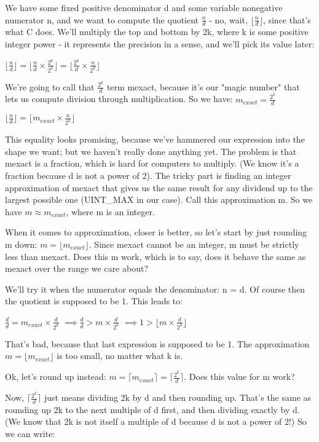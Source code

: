 We have some fixed positive denominator d and some variable nonegative numerator n, and we want to compute the quotient $\frac n d$ - no, wait, $\lfloor \frac n d \rfloor$, since that's what C does. We'll multiply the top and bottom by 2k, where k is some positive integer power - it represents the precision in a sense, and we'll pick its value later:

$\lfloor \frac n d \rfloor = \lfloor \frac n d \times \frac {2^k} {2^k} \rfloor = \lfloor \frac {2^k} d \times \frac n {2^k} \rfloor$

We're going to call that $\frac {2^k} d$ term mexact, because it's our "magic number" that lets us compute division through multiplication. So we have:
$m_{exact} = \frac {2^k} d $

$ \lfloor \frac n d \rfloor = \lfloor m_{exact} \times \frac n {2^k} \rfloor$

This equality looks promising, because we've hammered our expression into the shape we want; but we haven't really done anything yet. The problem is that mexact is a fraction, which is hard for computers to multiply. (We know it's a fraction because d is not a power of 2). The tricky part is finding an integer approximation of mexact that gives us the same result for any dividend up to the largest possible one (UINT_MAX in our case). Call this approximation m. So we have $m \approx m_{exact} $, where m is an integer.

When it comes to approximation, closer is better, so let's start by just rounding m down: $m = \lfloor m_{exact} \rfloor$. Since mexact cannot be an integer, m must be strictly less than mexact. Does this m work, which is to say, does it behave the same as mexact over the range we care about?

We'll try it when the numerator equals the denominator: n = d. Of course then the quotient is supposed to be 1. This leads to:

$\frac d d = m_{exact} \times \frac d {2^k}$
$\implies \frac d d > m \times \frac d {2^k}$
$\implies 1 > \lfloor m \times \frac d {2^k} \rfloor$

That's bad, because that last expression is supposed to be 1. The approximation $m = \lfloor m_{exact} \rfloor$ is too small, no matter what k is.

Ok, let's round up instead: $m = \lceil m_{exact} \rceil = \lceil \frac {2^k} d \rceil$. Does this value for m work?

Now, $\lceil \frac {2^k} d \rceil$ just means dividing 2k by d and then rounding up. That's the same as rounding up 2k to the next multiple of d first, and then dividing exactly by d. (We know that 2k is not itself a multiple of d because d is not a power of 2!) So we can write:

